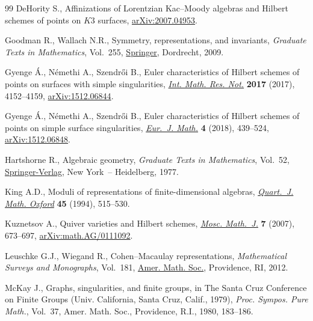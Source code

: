 \documentclass[10pt,a4paper]{amsart}
\numberwithin{equation}{section}
\begin{document}
\begin{thebibliography}{99}
DeHority S., Affinizations of {L}orentzian {K}ac--{M}oody algebras and
 {H}ilbert schemes of points on {$K3$} surfaces, \href{https://arxiv.org/abs/2007.04953}{arXiv:2007.04953}.

Goodman R., Wallach N.R., Symmetry, representations, and invariants,
 \textit{Graduate Texts in Mathematics}, Vol.~255, \href{https://doi.org/10.1007/978-0-387-79852-3}{Springer}, Dordrecht, 2009.

Gyenge \'A., N\'emethi A., Szendr\H{o}i B., Euler characteristics of {H}ilbert
 schemes of points on surfaces with simple singularities, \href{https://doi.org/10.1093/imrn/rnw139}{\textit{Int. Math.
 Res. Not.}} \textbf{2017} (2017), 4152--4159, \href{https://arxiv.org/abs/1512.06844}{arXiv:1512.06844}.

Gyenge \'A., N\'emethi A., Szendr\H{o}i B., Euler characteristics of {H}ilbert
 schemes of points on simple surface singularities, \href{https://doi.org/10.1007/s40879-018-0222-4}{\textit{Eur.~J. Math.}}
 \textbf{4} (2018), 439--524, \href{https://arxiv.org/abs/1512.06848}{arXiv:1512.06848}.

Hartshorne R., Algebraic geometry, \textit{Graduate Texts in Mathematics},
 Vol.~52, \href{https://doi.org/10.1007/978-1-4757-3849-0}{Springer-Verlag}, New York~-- Heidelberg, 1977.

King A.D., Moduli of representations of finite-dimensional algebras,
 \href{https://doi.org/10.1093/qmath/45.4.515}{\textit{Quart.~J. Math. Oxford}} \textbf{45} (1994), 515--530.

Kuznetsov A., Quiver varieties and {H}ilbert schemes, \href{https://doi.org/10.17323/1609-4514-2007-7-4-673-697}{\textit{Mosc. Math.~J.}}
 \textbf{7} (2007), 673--697, \href{https://arxiv.org/abs/math.AG/0111092}{arXiv:math.AG/0111092}.

Leuschke G.J., Wiegand R., Cohen--{M}acaulay representations,
 \textit{Mathematical Surveys and Monographs}, Vol.~181, \href{https://doi.org/10.1090/surv/181}{Amer. Math. Soc.},
 Providence, RI, 2012.

McKay J., Graphs, singularities, and finite groups, in The {S}anta {C}ruz
 {C}onference on {F}inite {G}roups ({U}niv. {C}alifornia, {S}anta {C}ruz,
 {C}alif., 1979), \textit{Proc. Sympos. Pure Math.}, Vol.~37, Amer. Math.
 Soc., Providence, R.I., 1980, 183--186.


\end{thebibliography}
\end{document}
